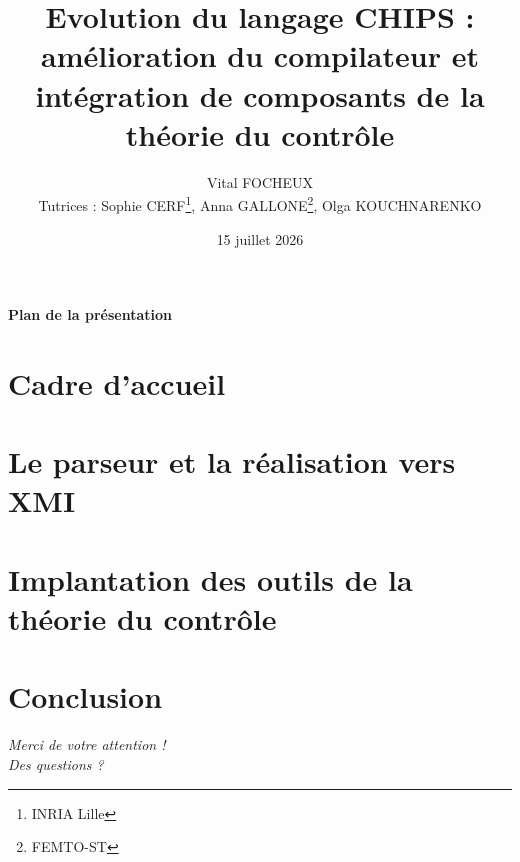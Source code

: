 \documentclass[UTF8]{beamer}
\title{Evolution du langage CHIPS : amélioration du compilateur et intégration de composants de la théorie du contrôle}
\author{\vspace{-5} Vital FOCHEUX \\
        Tutrices : Sophie CERF\footnote{INRIA Lille}, Anna GALLONE\footnote{\label{fn:source}FEMTO-ST}, Olga KOUCHNARENKO\footnotemark{\label{fn:source}}}
\date{15 juillet 2026}
\begin{document}
\maketitle

\footlinecolor{}
\begin{frame}[noframenumbering]{}
    \framesubtitle{Plan de la présentation}
    \tableofcontents
\end{frame}
\themecolor{}


% 

\section{Cadre d'accueil}


\section{Le parseur et la réalisation vers XMI}


\section{Implantation des outils de la théorie du contrôle}


\section{Conclusion}


\begingroup
  \begin{frame}[c]
    \centering
    \begin{minipage}{\textwidth}
      \centering
      \Huge \textsl{Merci de votre attention ! } \\
      \Huge \textsl{Des questions ?}
    \end{minipage}
  \end{frame}
\endgroup
\end{document}

